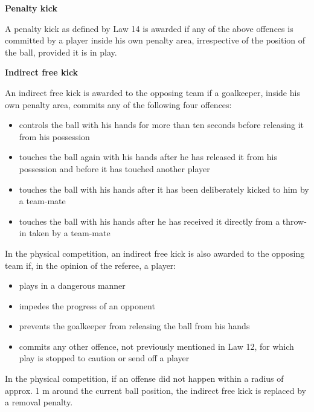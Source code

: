 \bigskip

{\bfseries Penalty kick}

\headlinebox

A penalty kick as defined by Law 14 is awarded if any of the above
offences is committed by a player inside his own penalty area,
irrespective of the position of the ball, provided it is in play.


\bigskip

{\bfseries Indirect free kick}

\headlinebox

An indirect free kick is awarded to the opposing team if a goalkeeper, inside his own penalty area, commits any of the following four offences: 

\begin{itemize}
\item controls the ball with his hands for more than ten seconds before releasing it from his possession
\item touches the ball again with his hands after he has released it from his possession and before it has touched another player
\item touches the ball with his hands after it has been deliberately kicked to him by a team-mate
\item touches the ball with his hands after he has received it directly from a throw-in taken by a team-mate
\end{itemize}

\bigskip

In the physical competition, an indirect free kick is also awarded to the opposing team if, in the opinion of the referee, a player:

\begin{itemize}
\item plays in a dangerous manner
\item impedes the progress of an opponent
\item prevents the goalkeeper from releasing the ball from his hands
\item commits any other offence, not previously mentioned in Law 12, for which play is stopped to caution or send off a player
\end{itemize}

\bigskip


In the physical competition, if an offense did not happen within a radius of approx. 1 m
around the current ball position, the indirect free kick is replaced by a
removal penalty.


